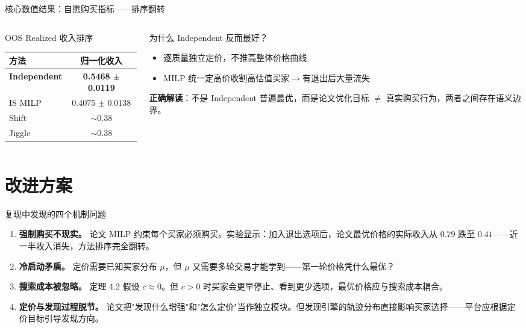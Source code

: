 \documentclass[10pt,aspectratio=169]{beamer}
\newcommand{\key}[1]{\textcolor{ZJUBlue}{\textbf{#1}}}
\newcommand{\good}[1]{\textcolor{ZJUGreen}{\textbf{#1}}}
\begin{document}
\begin{frame}{核心数值结果：自愿购买指标——排序翻转}
  \begin{columns}[T,onlytextwidth]
    \begin{column}{0.48\textwidth}
      \begin{block}{OOS Realized 收入排序}
        \begin{tabular}{lc}
          \toprule
          方法 & 归一化收入 \\
          \midrule
          \good{Independent} & \good{0.5468 $\pm$ 0.0119} \\
          IS MILP & 0.4075 $\pm$ 0.0138 \\
          Shift & $\sim$0.38 \\
          Jiggle & $\sim$0.38 \\
          \bottomrule
        \end{tabular}
      \end{block}
    \end{column}
    \begin{column}{0.48\textwidth}
      \begin{block}{为什么 Independent 反而最好？}
        \begin{itemize}
          \item 逐质量独立定价，不推高整体价格曲线
          \item MILP 统一定高价收割高估值买家$\rightarrow$有退出后大量流失
        \end{itemize}
      \end{block}
      \key{正确解读}：不是 Independent 普遍最优，而是论文优化目标 $\neq$ 真实购买行为，两者之间存在语义边界。
    \end{column}
  \end{columns}
\end{frame}

\section{改进方案}

\begin{frame}{复现中发现的四个机制问题}
\begin{enumerate}
\setlength{\itemsep}{0.5em}
\item \key{强制购买不现实。}
论文 MILP 约束每个买家必须购买。实验显示：加入退出选项后，论文最优价格的实际收入从 $0.79$ 跌至 $0.41$——近一半收入消失，方法排序完全翻转。

\item \key{冷启动矛盾。}
定价需要已知买家分布 $\mu$，但 $\mu$ 又需要多轮交易才能学到——第一轮价格凭什么最优？

    \item \key{搜索成本被忽略。}
    定理 4.2 假设 $c\approx0$。但 $c>0$ 时买家会更早停止、看到更少选项，最优价格应与搜索成本耦合。

    \item \key{定价与发现过程脱节。}
    论文把"发现什么增强"和"怎么定价"当作独立模块。但发现引擎的轨迹分布直接影响买家选择——平台应根据定价目标引导发现方向。
    \end{enumerate}
\end{frame}
\end{document}
